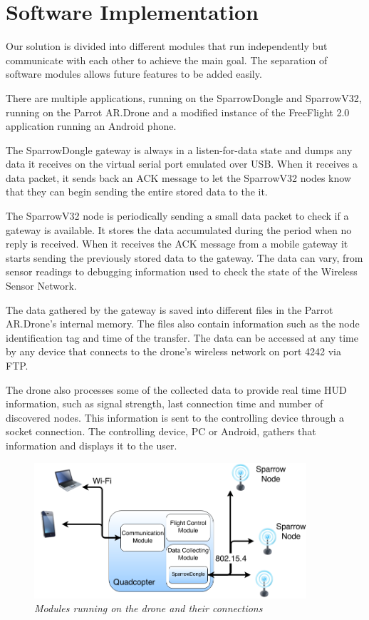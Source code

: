 \normalfont\normalsize
\chapter{Software Implementation}

Our solution is divided into different modules that run independently but communicate with each other to achieve the main goal. The separation of software modules allows future features to be added easily.

There are multiple applications, running on the SparrowDongle and SparrowV32, running on the Parrot AR.Drone and a modified instance of the FreeFlight 2.0 application running an Android phone.

The SparrowDongle gateway is always in a listen-for-data state and dumps any data it receives on the virtual serial port emulated over USB. When it receives a data packet, it sends back an ACK message to let the SparrowV32 nodes know that they can begin sending the entire stored data to the it.

The SparrowV32 node is periodically sending a small data packet to check if a gateway is available. It stores the data accumulated during the period when no reply is received. When it receives the ACK message from a mobile gateway it starts sending the previously stored data to the gateway. The data can vary, from sensor readings to debugging information used to check the state of the Wireless Sensor Network.

The data gathered by the gateway is saved into different files in the Parrot AR.Drone's internal memory. The files also contain information such as the node identification tag and time of the transfer. The data can be accessed at any time by any device that connects to the drone's wireless network on port 4242 via FTP.

The drone also processes some of the collected data to provide real time HUD information, such as signal strength, last connection time and number of discovered nodes. This information is sent to the controlling device through a socket connection. The controlling device, PC or Android, gathers that information and displays it to the user. %

\clearpage

\begin{figure}[ht]
\begin{center}
\includegraphics[width=0.9\textwidth]{img/organigrama.png}
\end{center}
\caption{\small \itshape{Modules running on the drone and their connections}}
\end{figure}

